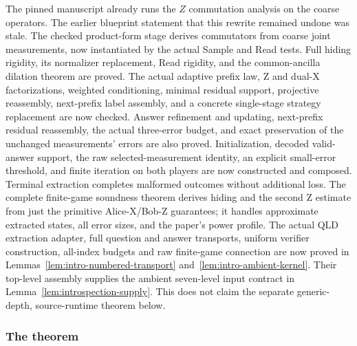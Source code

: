 \begin{remark}
\label{rem:intro-commutation-gap}
The pinned manuscript already runs the $Z$ commutation analysis on the coarse
operators. The earlier blueprint statement that this rewrite remained undone
was stale. The checked product-form stage derives commutators from coarse
joint measurements, now instantiated by the actual Sample and Read tests.
Full hiding rigidity, its normalizer replacement, Read rigidity, and the
common-ancilla dilation theorem are proved. The actual adaptive prefix law,
Z and dual-X factorizations, weighted conditioning, minimal residual support,
projective reassembly, next-prefix label assembly, and a concrete single-stage
strategy replacement are now checked. Answer refinement and updating,
next-prefix residual reassembly, the actual three-error budget, and exact
preservation of the unchanged measurements' errors are also proved.
Initialization, decoded valid-answer support, the raw selected-measurement
identity, an explicit small-error threshold, and finite iteration on both
players are now constructed and composed. Terminal extraction completes
malformed outcomes without additional loss. The complete finite-game
soundness theorem derives hiding and the second Z estimate from just the
primitive Alice-X/Bob-Z guarantees; it handles approximate extracted states,
all error sizes, and the paper's power profile. The actual QLD extraction
adapter, full question and answer transports, uniform verifier construction,
all-index budgets and raw finite-game connection are now proved in
Lemmas~\ref{lem:intro-numbered-transport} and~\ref{lem:intro-ambient-kernel}.
Their top-level assembly supplies the ambient seven-level input contract in
Lemma~\ref{lem:introspection-supply}.
This does not claim the separate generic-depth, source-runtime theorem below.
\end{remark}

\subsubsection{The theorem}

